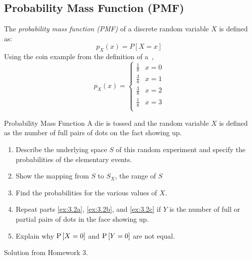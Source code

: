 	\subsection{Probability Mass Function  (PMF)} \label{subsec:Probability Mass Function}
		\begin{definition} \label{def:Probability Mass Function}
			The \emph{probability mass function (PMF)} of a discrete random variable $X$ is defined as:
			\begin{equation} \label{eq:Probability Mass Function}
				p_{X} \left( x \right) = P \left[ X=x \right]
			\end{equation}
			Using the coin example from the definition of a~,
			\begin{equation}
				p_{X} \left( x \right) = 
				\begin{cases}
					\frac{1}{8} & x=0 \\
					\frac{3}{8} & x=1 \\
					\frac{3}{8} & x=2 \\
					\frac{1}{8} & x=3 \\
				\end{cases}
			\end{equation}
		\end{definition}
		\begin{example}[Problem 3.2]{Probability Mass Function}
		A die is tossed and the random variable $X$ is defined as the number of full pairs of dots on the fact showing up.
			\begin{enumerate}[label=\textbf{(\alph*)}, ref=(\alph*)]
				\item Describe the underlying space $S$ of this random experiment and specify the probabilities of the elementary events. \label{ex:3.2a}
				\item Show the mapping from $S$ to $S_{X}$, the range of $S$ \label{ex:3.2b}
				\item Find the probabilities for the various values of $X$. \label{ex:3.2c}
				\item Repeat parts \ref{ex:3.2a}, \ref{ex:3.2b}, and \ref{ex:3.2c} if $Y$ is the number of full or partial pairs of dots in the face showing up.
				\item Explain why $\operatorname{\operatorname{P}} \left[ X = 0 \right]$ and $\operatorname{\operatorname{P}} \left[ Y = 0 \right]$ are not equal.
			\end{enumerate}
		
		\tcblower
		
		Solution from Homework 3.
		\end{example}
		

